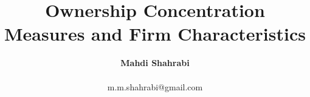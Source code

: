 \documentclass[12pt,letterpaper]{article}
\begin{document}
\title{Ownership Concentration Measures and Firm Characteristics}
\author{\Large\textbf{Mahdi Shahrabi} \\~\\m.m.shahrabi@gmail.com}
\maketitle

\newpage
\pagestyle{fancyplain}





\begin{landscape}

\end{landscape}


\begin{landscape}
	
\end{landscape}


\begin{landscape}
	
\end{landscape}

\end{document}
